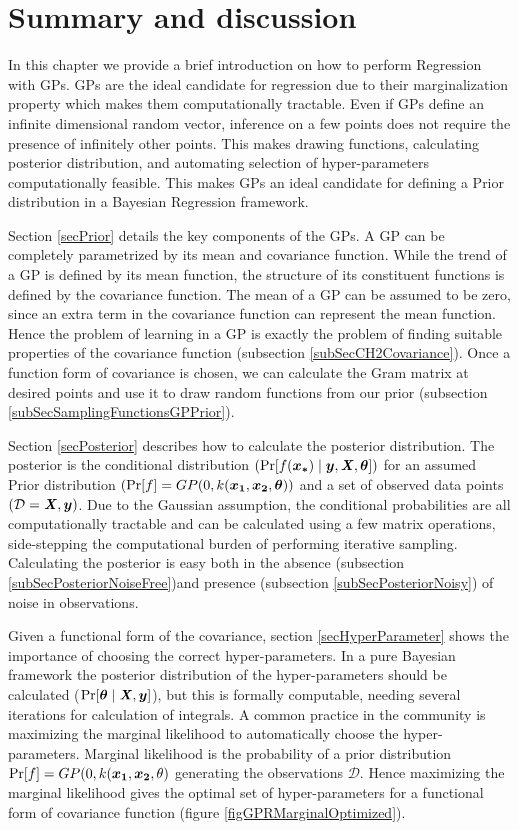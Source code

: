 \section{Summary and discussion}\label{secCH2Discussion}
In this chapter we provide a brief introduction on how to perform Regression with GPs. GPs are the ideal candidate for regression due to their marginalization property which makes them computationally tractable. Even if GPs define an infinite dimensional random vector, inference on a few points does not require the presence of infinitely other points. This makes drawing functions, calculating posterior distribution, and automating selection of hyper-parameters computationally feasible. This makes GPs an ideal candidate for defining a Prior distribution in a Bayesian Regression framework. 

Section \ref{secPrior} details the key components of the GPs. A GP can be completely parametrized by its mean and covariance function. While the trend of a GP is defined by its mean function, the structure of its constituent functions is defined by the covariance function. The mean of a GP can be assumed to be zero, since an extra term in the covariance function can represent the mean function. Hence the problem of learning in a GP is exactly the problem of finding suitable properties of the covariance function (subsection \ref{subSecCH2Covariance}). Once a function form of covariance is chosen, we can calculate the Gram matrix at desired points and use it to draw random functions from our prior (subsection \ref{subSecSamplingFunctionsGPPrior}). 

Section \ref{secPosterior} describes how to calculate the posterior distribution. The posterior is the conditional distribution $(\Pr[f(\boldsymbol{x_{*}}) \mid \boldsymbol{y}, \bm{\mathit{X}}, \boldsymbol{\theta}])$ for an assumed Prior distribution $(\Pr[f] = GP(0, k(\boldsymbol{x_1}, \boldsymbol{x_2}, \boldsymbol{\theta}))$ and a set of observed data points $(\mathcal{D} = {\bm{\mathit{X}}, \boldsymbol{y}})$. Due to the Gaussian assumption, the conditional probabilities are all computationally tractable and can be calculated using a few matrix operations, side-stepping the computational burden of performing iterative sampling. Calculating the posterior is easy both in the absence (subsection \ref{subSecPosteriorNoiseFree})and presence (subsection \ref{subSecPosteriorNoisy}) of noise in observations. 

Given a functional form of the covariance, section \ref{secHyperParameter} shows the importance of choosing the correct hyper-parameters. In a pure Bayesian framework the posterior distribution of the hyper-parameters should be calculated ($\Pr[\boldsymbol{\theta} \mid \bm{\mathit{X}}, \boldsymbol{y}]$), but this is formally computable, needing several iterations for calculation of integrals. A common practice in the community is maximizing the marginal likelihood to automatically choose the hyper-parameters. Marginal likelihood is the probability of a prior distribution $\Pr[f] = GP(0, k(\boldsymbol{x_1}, \boldsymbol{x_2}, \theta)$ generating the observations $\mathcal{D}$. Hence maximizing the marginal likelihood gives the optimal set of hyper-parameters for a functional form of covariance function (figure \ref{figGPRMarginalOptimized}). 

